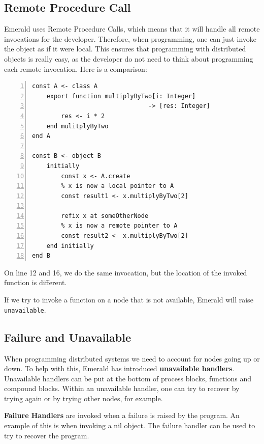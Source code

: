 \subsection{Remote Procedure Call}
Emerald uses Remote Procedure Calls, which means that it will handle all remote invocations for the developer. Therefore, when programming, one can just invoke the object as if it were local. This ensures that programming with distributed objects is really easy, as the developer do not need to think about programming each remote invocation. Here is a comparison:
\begin{lstlisting}[language=emerald, numbers=left]
const A <- class A
    export function multiplyByTwo[i: Integer] 
                                -> [res: Integer]
        res <- i * 2
    end mulitplyByTwo
end A

const B <- object B
    initially
        const x <- A.create
        % x is now a local pointer to A
        const result1 <- x.multiplyByTwo[2]
        
        refix x at someOtherNode
        % x is now a remote pointer to A
        const result2 <- x.multiplyByTwo[2] 
    end initially
end B
\end{lstlisting}
On line 12 and 16, we do the same invocation, but the location of the invoked function is different.

If we try to invoke a function on a node that is not available, Emerald will raise \verb|unavailable|.




\subsection{Failure and Unavailable}
When programming distributed systems we need to account for nodes going up or down. To help with this, Emerald has introduced \textbf{unavailable handlers}. Unavailable handlers can be put at the bottom of process blocks, functions and compound blocks. Within an unavailable handler, one can try to recover by trying again or by trying other nodes, for example.

\textbf{Failure Handlers} are invoked when a failure is raised by the program. An example of this is when invoking a nil object. The failure handler can be used to try to recover the program.

